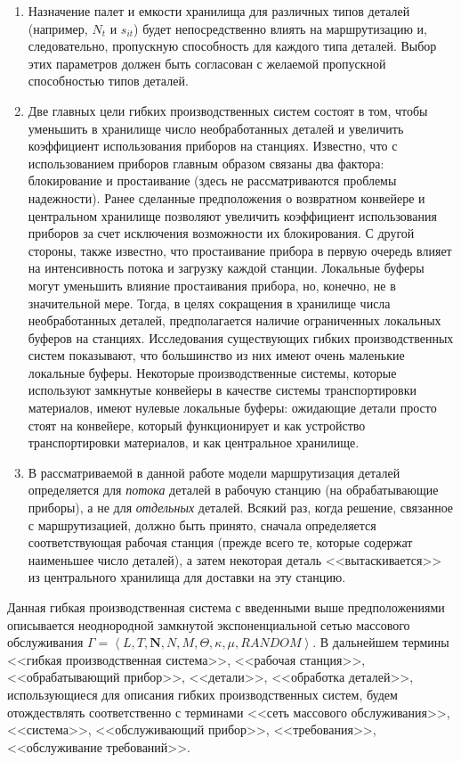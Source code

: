 \begin{enumerate}
\item Назначение палет и емкости хранилища для различных типов деталей (например, $N_t$ и $s_{it}$) будет непосредственно влиять на маршрутизацию и, следовательно, пропускную способность для каждого типа деталей. Выбор этих параметров должен быть согласован с желаемой пропускной способностью типов деталей.

\item Две главных цели гибких производственных систем состоят в том, чтобы уменьшить в хранилище число необработанных деталей и увеличить коэффициент использования приборов на станциях. Известно, что с использованием приборов главным образом связаны два фактора: блокирование и простаивание (здесь не рассматриваются проблемы надежности). Ранее сделанные предположения о возвратном конвейере и центральном хранилище позволяют увеличить коэффициент использования приборов за счет исключения возможности их блокирования. С другой стороны, также известно, что простаивание прибора в первую очередь влияет на интенсивность потока и загрузку каждой станции. Локальные буферы могут уменьшить влияние простаивания прибора, но, конечно, не в значительной мере. Тогда, в целях сокращения в хранилище числа необработанных деталей, предполагается наличие ограниченных локальных буферов на станциях. Исследования существующих гибких производственных систем показывают, что большинство из них имеют очень маленькие локальные буферы. Некоторые производственные системы, которые используют замкнутые конвейеры в качестве системы транспортировки материалов, имеют нулевые локальные буферы: ожидающие детали просто стоят на конвейере, который функционирует и как устройство транспортировки материалов, и как центральное хранилище.

\item В рассматриваемой в данной работе модели маршрутизация деталей определяется для \textit{потока} деталей в рабочую станцию (на обрабатывающие приборы), а не для \textit{отдельных} деталей. Всякий раз, когда решение, связанное с маршрутизацией, должно быть принято, сначала определяется соответствующая рабочая станция (прежде всего те, которые содержат наименьшее число деталей), а затем некоторая деталь <<вытаскивается>> из центрального хранилища для доставки на эту станцию.
\end{enumerate}

Данная гибкая производственная система с введенными выше предположениями описывается неоднородной замкнутой экспоненциальной сетью массового обслуживания $\Gamma=\left<L,T,\mathbf{N},N,M,\Theta,\kappa,\mu,\textit{RANDOM}\right>$. В дальнейшем термины <<гибкая производственная система>>, <<рабочая станция>>, <<обрабатывающий прибор>>, <<детали>>, <<обработка деталей>>, использующиеся для описания гибких производственных систем, будем отождествлять соответственно с терминами <<сеть массового обслуживания>>, <<система>>, <<обслуживающий прибор>>, <<требования>>, <<обслуживание требований>>.

